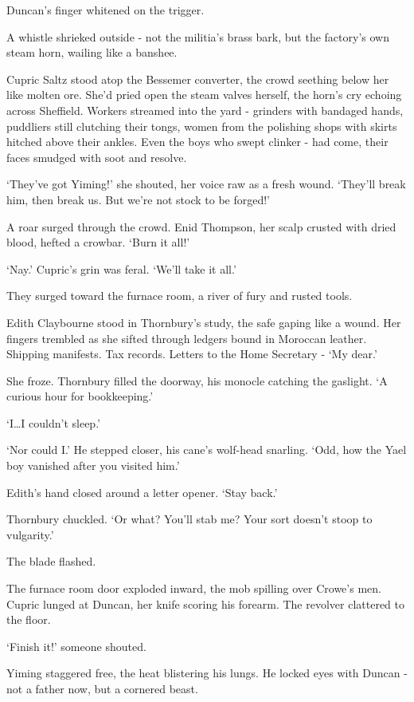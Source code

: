 Duncan's finger whitened on the trigger.

A whistle shrieked outside - not the militia's brass bark, but the factory's own steam horn, wailing like a banshee.

Cupric Saltz stood atop the Bessemer converter, the crowd seething below her like molten ore. She'd pried open the steam valves herself, the horn's cry echoing across Sheffield. Workers streamed into the yard - grinders with bandaged hands, puddliers still clutching their tongs, women from the polishing shops with skirts hitched above their ankles. Even the boys who swept clinker - had come, their faces smudged with soot and resolve.

`They've got Yiming!' she shouted, her voice raw as a fresh wound. `They'll break him, then break us. But we're not stock to be forged!'

A roar surged through the crowd. Enid Thompson, her scalp crusted with dried blood, hefted a crowbar. `Burn it all!'

`Nay.' Cupric's grin was feral. `We'll take it all.'

They surged toward the furnace room, a river of fury and rusted tools.

Edith Claybourne stood in Thornbury's study, the safe gaping like a wound. Her fingers trembled as she sifted through ledgers bound in Moroccan leather. Shipping manifests. Tax records. Letters to the Home Secretary - `My dear.'

She froze. Thornbury filled the doorway, his monocle catching the gaslight. `A curious hour for bookkeeping.'

`I\dots I couldn't sleep.'

`Nor could I.' He stepped closer, his cane's wolf-head snarling. `Odd, how the Yael boy vanished after you visited him.'

Edith's hand closed around a letter opener. `Stay back.'

Thornbury chuckled. `Or what? You'll stab me? Your sort doesn't stoop to vulgarity.'

The blade flashed.

The furnace room door exploded inward, the mob spilling over Crowe's men. Cupric lunged at Duncan, her knife scoring his forearm. The revolver clattered to the floor.

`Finish it!' someone shouted.

Yiming staggered free, the heat blistering his lungs. He locked eyes with Duncan - not a father now, but a cornered beast.


